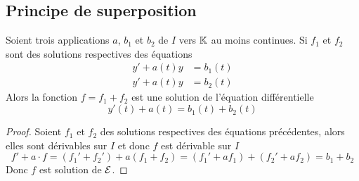 \subsection{Principe de superposition}
\label{subsec:principesuperposition}
\begin{prop}
  Soient trois applications \(a\), \(b_1\) et \(b_2\) de \(I\) vers \(\mathbb{K}\) au moins continues. Si \(f_1\) et \(f_2\) sont des solutions respectives des équations
  \begin{align}
    y'+a(t)y&=b_1(t)\\ 
    y'+a(t)y&=b_2(t)
  \end{align}
Alors la fonction \(f=f_1+f_2\) est une solution de l'équation différentielle 
\begin{equation}
  y'(t)+a(t)=b_1(t)+b_2(t)
\end{equation}
\end{prop}
\begin{proof}
  Soient \(f_1\) et \(f_2\) des solutions respectives des équations précédentes, alors elles sont dérivables sur \(I\) et donc \(f\) est dérivable sur \(I\)
  \begin{equation}
    f'+a \cdot f=(f_1' + f_2')+a(f_1+f_2)=(f_1'+af_1)+(f_2'+af_2)=b_1+b_2
  \end{equation}
Donc \(f\) est solution de \(\mathcal{E}\).
\end{proof}
%
